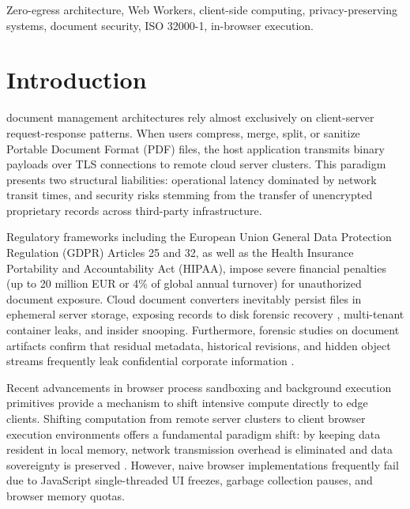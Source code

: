 \documentclass[journal]{IEEEtran}
\begin{document}
\begin{IEEEkeywords}
Zero-egress architecture, Web Workers, client-side computing, privacy-preserving systems, document security, ISO 32000-1, in-browser execution.
\end{IEEEkeywords}

\IEEEpeerreviewmaketitle

\section{Introduction}
 document management architectures rely almost exclusively on client-server request-response patterns. When users compress, merge, split, or sanitize Portable Document Format (PDF) files, the host application transmits binary payloads over TLS connections to remote cloud server clusters. This paradigm presents two structural liabilities: operational latency dominated by network transit times, and security risks stemming from the transfer of unencrypted proprietary records across third-party infrastructure.

Regulatory frameworks including the European Union General Data Protection Regulation (GDPR) Articles 25 and 32, as well as the Health Insurance Portability and Accountability Act (HIPAA), impose severe financial penalties (up to 20 million EUR or 4\% of global annual turnover) for unauthorized document exposure. Cloud document converters inevitably persist files in ephemeral server storage, exposing records to disk forensic recovery \cite{garfinkel2003remembrance}, multi-tenant container leaks, and insider snooping. Furthermore, forensic studies on document artifacts confirm that residual metadata, historical revisions, and hidden object streams frequently leak confidential corporate information \cite{byers2004information, castiglione2010security}.

Recent advancements in browser process sandboxing and background execution primitives \cite{whatwg2024workers, jang2012quark} provide a mechanism to shift intensive compute directly to edge clients. Shifting computation from remote server clusters to client browser execution environments offers a fundamental paradigm shift: by keeping data resident in local memory, network transmission overhead is eliminated and data sovereignty is preserved \cite{satyanarayanan2017emergence, kleppmann2019local}. However, naive browser implementations frequently fail due to JavaScript single-threaded UI freezes, garbage collection pauses, and browser memory quotas.
\end{document}

